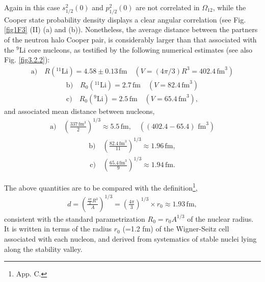  Again in this case $s_{1/2}^2(0)$ and $p_{1/2}^2(0)$ are not correlated in $\Omega_{12}$, while the Cooper state probability density displays a clear angular correlation 
  (see Fig. \ref{fig1F3} (II) (a) and (b)). Nonetheless, the average distance between the partners of the neutron halo Cooper pair, is considerably larger than that associated with the $^9$Li core nucleons, as testified by the following numerical estimates (see also Fig. \ref{fig3.2.2}):
\begin{align}\label{eq3.2.21}
 \text{a)}\quad R(^{11}\text{Li})= 4.58\pm 0.13 \,\text{fm}\quad (V=\left(4\pi/3\right)R^3=402.4 \,\text{fm}^3)
\end{align}
\begin{align}
 \text{b)}\quad R_0 (^{11}\text{Li})=2.7\,\text{fm}\quad (V=82.4\,\text{fm}^3)
\end{align}
\begin{align}
 \text{c)}\quad R_0 (^{9}\text{Li})=2.5\,\text{fm}\quad (V=65.4\,\text{fm}^3),
\end{align}
and associated mean distance between nucleons, 
\begin{align}\label{eq3.2.24}
 \text{a)}\quad \left(\frac{337\,\text{fm}^3}{2}\right)^{1/3}\approx 5.5\,\text{fm},\quad((402.4-65.4)\text{ fm}^3)
\end{align}
\begin{align}
 \text{b)}\quad \left(\frac{82.4\,\text{fm}^3}{11}\right)^{1/3}\approx 1.96\,\text{fm},
\end{align}
\begin{align}\label{eq4.3.9}
 \text{c)}\quad \left(\frac{65.4\,\text{fm}^3}{9}\right)^{1/3}\approx 1.94\,\text{fm}.
\end{align}



The above quantities are to be compared with the definition\footnote{\cite{Brink:05} App. C.},
\begin{align}\label{eq3.2.27}
d=\left(\frac{\frac{4\pi}{3}R^3}{A}\right)^{1/3}=\left(\frac{4\pi}{3}\right)^{1/3}\times r_0\approx 1.93\, \text{fm},
\end{align} 
consistent with the standard parametrization $R_0=r_0A^{1/3}$ of the nuclear radius. It is written in terms of the  radius $r_0$ (=1.2 fm) of the Wigner-Seitz cell associated with each nucleon, and derived from systematics of stable nuclei lying along the stability valley.
